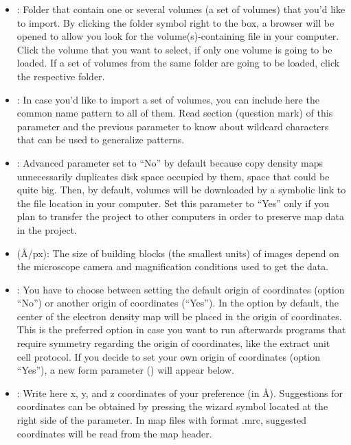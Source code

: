\begin{itemize}
\begin{itemize}
  \begin{itemize}
   \item {}: Folder that contain one or several volumes (a set of volumes) that you'd like to import. By clicking the folder symbol right to the  box, a browser will be opened to allow you look for the volume(s)-containing file in your computer. Click the volume that you want to select, if only one volume is going to be loaded. If a set of volumes from the same folder are going to be loaded, click the respective folder.\\
   \item {}: In case you'd like to import a set of volumes, you can include here the common name pattern to all of them. Read  section (question mark) of this parameter and the previous parameter  to know about wildcard characters that can be used to generalize patterns.\\
   \item {}: Advanced parameter set to ``No'' by default because copy density maps unnecessarily duplicates disk space occupied by them, space that could be quite big. Then, by default, volumes will be downloaded by a symbolic link to the file location in your computer. Set this parameter to ``Yes'' only if you plan to transfer the project to other computers in order to preserve map data in the \scipion project.\\
   \item {} (\AA/px): The size of building blocks (the smallest units) of images depend on the microscope camera and magnification conditions used to get the data.\\
   \item {}: You have to choose between setting the default origin of coordinates (option ``No'') or another origin of coordinates (``Yes''). In the option by default, the center of the electron density map will be placed in the origin of coordinates. This is the preferred option in case you want to run afterwards programs that require symmetry regarding the origin of coordinates, like the extract unit cell protocol. If you decide to set your own origin of coordinates (option ``Yes''), a new form parameter () will appear below.\\
   \item {}: Write here x, y, and z coordinates of your preference (in \AA). Suggestions for coordinates can be obtained by pressing the wizard symbol located at the right side of the  parameter. In map files with format .mrc, suggested coordinates will be read from the map header.\\
   \end{itemize}
   

\end{itemize}
\end{itemize}
